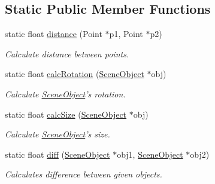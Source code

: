 \subsection*{\-Static \-Public \-Member \-Functions}
\begin{DoxyCompactItemize}
\item 
static float \hyperlink{classSceneObject_a88edb8cb30023a191e069bd58a023284}{distance} (\-Point $\ast$p1, \-Point $\ast$p2)
\begin{DoxyCompactList}\small\item\em \-Calculate distance between points. \end{DoxyCompactList}\item 
static float \hyperlink{classSceneObject_a28760e8940891ea1b853c94dcba78613}{calc\-Rotation} (\hyperlink{classSceneObject}{\-Scene\-Object} $\ast$obj)
\begin{DoxyCompactList}\small\item\em \-Calculate \hyperlink{classSceneObject}{\-Scene\-Object}'s rotation. \end{DoxyCompactList}\item 
static float \hyperlink{classSceneObject_a1e9ae1624ec912371dbb2313d16e3034}{calc\-Size} (\hyperlink{classSceneObject}{\-Scene\-Object} $\ast$obj)
\begin{DoxyCompactList}\small\item\em \-Calculate \hyperlink{classSceneObject}{\-Scene\-Object}'s size. \end{DoxyCompactList}\item 
static float \hyperlink{classSceneObject_a3625deecbe9dbea41241a7b52fa5ad00}{diff} (\hyperlink{classSceneObject}{\-Scene\-Object} $\ast$obj1, \hyperlink{classSceneObject}{\-Scene\-Object} $\ast$obj2)
\begin{DoxyCompactList}\small\item\em \-Calculates difference between given objects. \end{DoxyCompactList}\end{DoxyCompactItemize}
